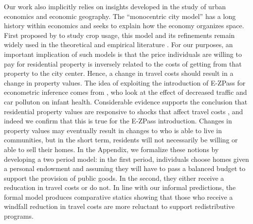 Our work also implicitly relies on insights developed in the study of urban economics and economic geography. The ``monocentric city model'' has a long history within economics and seeks to explain how the economy organizes space. First proposed by \textcite{Thunen1826} to study crop usage, this model and its refinements remain widely used in the theoretical and empirical literature \parencite{Alonso,Fujita1999,BaumSnow2007}. For our purposes, an important implication of such models is that the price individuals are willing to pay for residential property is inversely related to the costs of getting from that property to the city center. Hence, a change in travel costs should result in a change in property values. The idea of exploiting the introduction of E-ZPass for econometric inference comes from \textcite{Currie2011a}, who look at the effect of decreased traffic and car polluton on infant health. Considerable evidence supports the conclusion that residential property values are responsive to shocks that affect travel costs \parencite{Levkovich2016}, and indeed we confirm that this is true for the E-ZPass introduction. Changes in property values may eventually result in changes to who is able to live in communities, but in the short term, residents will not necessarily be willing or able to sell their homes. In the Appendix, we formalize these notions by developing a two period model: in the first period, individuals choose homes given a personal endowment and assuming they will have to pass a balanced budget to support the provision of public goods. In the second, they either receive a reducation in travel costs or do not. In line with our informal predictions, the formal model produces comparative statics showing that those who receive a windfall reduction in travel costs are more reluctant to support redistributive programs. 


